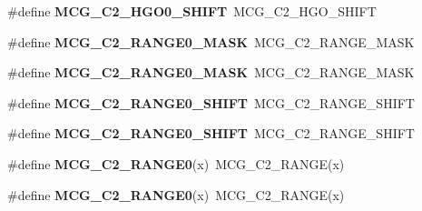 \begin{DoxyCompactItemize}
\item 
\#define {\bfseries M\+C\+G\+\_\+\+C2\+\_\+\+H\+G\+O0\+\_\+\+S\+H\+I\+FT}~M\+C\+G\+\_\+\+C2\+\_\+\+H\+G\+O\+\_\+\+S\+H\+I\+FT\hypertarget{group__Backward__Compatibility__Symbols_ga881979b382aef0029c4e4990e365d8f5}{}\label{group__Backward__Compatibility__Symbols_ga881979b382aef0029c4e4990e365d8f5}

\item 
\#define {\bfseries M\+C\+G\+\_\+\+C2\+\_\+\+R\+A\+N\+G\+E0\+\_\+\+M\+A\+SK}~M\+C\+G\+\_\+\+C2\+\_\+\+R\+A\+N\+G\+E\+\_\+\+M\+A\+SK\hypertarget{group__Backward__Compatibility__Symbols_ga5436f4e93034d8536c23eabcac1b1a43}{}\label{group__Backward__Compatibility__Symbols_ga5436f4e93034d8536c23eabcac1b1a43}

\item 
\#define {\bfseries M\+C\+G\+\_\+\+C2\+\_\+\+R\+A\+N\+G\+E0\+\_\+\+M\+A\+SK}~M\+C\+G\+\_\+\+C2\+\_\+\+R\+A\+N\+G\+E\+\_\+\+M\+A\+SK\hypertarget{group__Backward__Compatibility__Symbols_ga5436f4e93034d8536c23eabcac1b1a43}{}\label{group__Backward__Compatibility__Symbols_ga5436f4e93034d8536c23eabcac1b1a43}

\item 
\#define {\bfseries M\+C\+G\+\_\+\+C2\+\_\+\+R\+A\+N\+G\+E0\+\_\+\+S\+H\+I\+FT}~M\+C\+G\+\_\+\+C2\+\_\+\+R\+A\+N\+G\+E\+\_\+\+S\+H\+I\+FT\hypertarget{group__Backward__Compatibility__Symbols_gaca9dfaea66978e556c7a9773e2c8c531}{}\label{group__Backward__Compatibility__Symbols_gaca9dfaea66978e556c7a9773e2c8c531}

\item 
\#define {\bfseries M\+C\+G\+\_\+\+C2\+\_\+\+R\+A\+N\+G\+E0\+\_\+\+S\+H\+I\+FT}~M\+C\+G\+\_\+\+C2\+\_\+\+R\+A\+N\+G\+E\+\_\+\+S\+H\+I\+FT\hypertarget{group__Backward__Compatibility__Symbols_gaca9dfaea66978e556c7a9773e2c8c531}{}\label{group__Backward__Compatibility__Symbols_gaca9dfaea66978e556c7a9773e2c8c531}

\item 
\#define {\bfseries M\+C\+G\+\_\+\+C2\+\_\+\+R\+A\+N\+G\+E0}(x)~M\+C\+G\+\_\+\+C2\+\_\+\+R\+A\+N\+GE(x)\hypertarget{group__Backward__Compatibility__Symbols_ga4717ad2318b6cbc4586d554b59d0382e}{}\label{group__Backward__Compatibility__Symbols_ga4717ad2318b6cbc4586d554b59d0382e}

\item 
\#define {\bfseries M\+C\+G\+\_\+\+C2\+\_\+\+R\+A\+N\+G\+E0}(x)~M\+C\+G\+\_\+\+C2\+\_\+\+R\+A\+N\+GE(x)\hypertarget{group__Backward__Compatibility__Symbols_ga4717ad2318b6cbc4586d554b59d0382e}{}\label{group__Backward__Compatibility__Symbols_ga4717ad2318b6cbc4586d554b59d0382e}


\end{DoxyCompactItemize}
